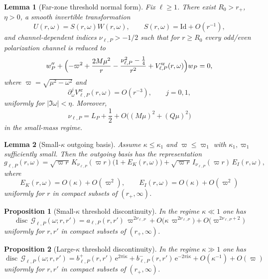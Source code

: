 \documentclass[10pt,a4paper]{amsart}
\newtheorem{proposition}{Proposition}
\newtheorem{lemma}{Lemma}
\newcommand{\Id}{\mathrm{Id}}
\newcommand{\abs}[1]{\left|#1\right|}
\newcommand{\cG}{\mathcal G}
\newcommand{\disc}{\operatorname{disc}}
\newcommand{\ee}{\mathrm e}
\newcommand{\ii}{\mathrm i}
\newcommand{\kap}{\kappa}
\newcommand{\om}{\omega}
\newcommand{\vp}{\varpi}
\begin{document}
\begin{lemma}[Far-zone threshold normal form]\label{lem:normal_form}
Fix $\ell\ge1$.  There exist $R_0>r_+$, $\eta>0$, a smooth invertible transformation
\[
   U(r,\om)=S(r,\om)W(r,\om),
   \qquad
   S(r,\om)=\Id+O(r^{-1}),
\]
and channel-dependent indices $\nu_{\ell,P}>-1/2$ such that for $r\ge R_0$ every odd/even polarization channel is reduced to
\begin{equation}\label{eq:threshold_normal_form}
   w_P''+
   \Bigl(
      -\vp^2
      +\frac{2M\mu^2}{r}
      -\frac{\nu_{\ell,P}^2-\tfrac14}{r^2}
      +V_{\ell,P}^{\mathrm{sr}}(r,\om)
   \Bigr)w_P
   =0,
\end{equation}
where $\vp=\sqrt{\mu^2-\om^2}$ and
\[
   \partial_\om^jV_{\ell,P}^{\mathrm{sr}}(r,\om)=O(r^{-3}),
   \qquad j=0,1,
\]
uniformly for $\abs{\Im\om}<\eta$.  Moreover,
\begin{equation}\label{eq:nu_expansion}
   \nu_{\ell,P}=L_P+\frac12+O\bigl((M\mu)^2+(Q\mu)^2\bigr)
\end{equation}
in the small-mass regime.
\end{lemma}

\begin{lemma}[Small-$\kap$ outgoing basis]\label{lem:small_kappa_basis}
Assume $\kap\le\kap_1$ and $\vp\le\vp_1$ with $\kap_1,\vp_1$ sufficiently small.  Then the outgoing basis has the representation
\begin{equation}\label{eq:small_kappa_basis_rep}
   g_{\ell,P}(r,\om)
   =
   \sqrt{\vp r}\,K_{\nu_{\ell,P}}(\vp r)\bigl(1+E_K(r,\om)\bigr)
   +
   \sqrt{\vp r}\,I_{\nu_{\ell,P}}(\vp r)\,E_I(r,\om),
\end{equation}
where
\[
   E_K(r,\om)=O(\kap)+O(\vp^2),
   \qquad
   E_I(r,\om)=O(\kap)+O(\vp^2)
\]
uniformly for $r$ in compact subsets of $(r_+,\infty)$.
\end{lemma}

\begin{proposition}[Small-$\kap$ threshold discontinuity]\label{prop:small_kappa_disc}
In the regime $\kap\ll1$ one has
\begin{equation}\label{eq:small_kappa_disc}
   \disc\,\cG_{\ell,P}(\om;r,r')
   =
   a_{\ell,P}(r,r')\,\vp^{2\nu_{\ell,P}}
   +
   O\!\bigl(\kap\,\vp^{2\nu_{\ell,P}}\bigr)
   +
   O\!\bigl(\vp^{2\nu_{\ell,P}+2}\bigr)
\end{equation}
uniformly for $r,r'$ in compact subsets of $(r_+,\infty)$.
\end{proposition}

\begin{proposition}[Large-$\kap$ threshold discontinuity]\label{prop:large_kappa_disc}
In the regime $\kap\gg1$ one has
\begin{equation}\label{eq:large_kappa_disc}
   \disc\,\cG_{\ell,P}(\om;r,r')
   =
   b^+_{\ell,P}(r,r')\,\ee^{2\pi\ii\kap}
   +
   b^-_{\ell,P}(r,r')\,\ee^{-2\pi\ii\kap}
   +
   O(\kap^{-1})+O(\vp)
\end{equation}
uniformly for $r,r'$ in compact subsets of $(r_+,\infty)$.
\end{proposition}
\end{document}
